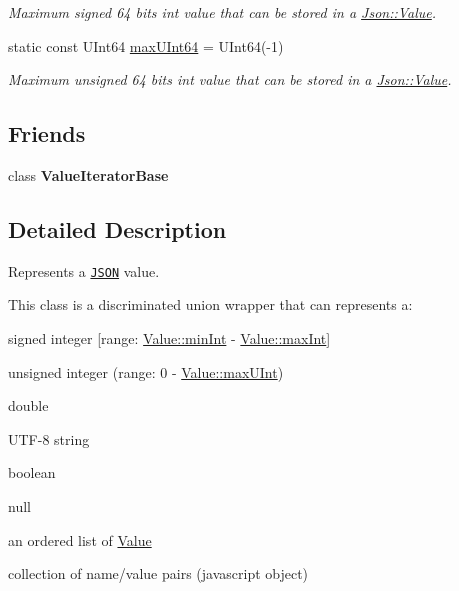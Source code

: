 \begin{DoxyCompactItemize}
\begin{DoxyCompactList}\small\item\em Maximum signed 64 bits int value that can be stored in a \hyperlink{class_json_1_1_value}{Json\+::\+Value}. \end{DoxyCompactList}\item 
\hypertarget{class_json_1_1_value_ae1eb89c305c39516696ff305cffa01da}{}static const U\+Int64 \hyperlink{class_json_1_1_value_ae1eb89c305c39516696ff305cffa01da}{max\+U\+Int64} = U\+Int64(-\/1)\label{class_json_1_1_value_ae1eb89c305c39516696ff305cffa01da}

\begin{DoxyCompactList}\small\item\em Maximum unsigned 64 bits int value that can be stored in a \hyperlink{class_json_1_1_value}{Json\+::\+Value}. \end{DoxyCompactList}\end{DoxyCompactItemize}
\subsection*{Friends}
\begin{DoxyCompactItemize}
\item 
\hypertarget{class_json_1_1_value_ad016df56489e5d360735457afba2f649}{}class {\bfseries Value\+Iterator\+Base}\label{class_json_1_1_value_ad016df56489e5d360735457afba2f649}

\end{DoxyCompactItemize}


\subsection{Detailed Description}
Represents a \href{http://www.json.org}{\tt J\+S\+O\+N} value. 

This class is a discriminated union wrapper that can represents a\+:
\begin{DoxyItemize}
\item signed integer \mbox{[}range\+: \hyperlink{class_json_1_1_value_a7df8a39e2502b8c92a6a41e3d752d2c8}{Value\+::min\+Int} -\/ \hyperlink{class_json_1_1_value_a978c799a8af3114ef7dab6fd0a310a1b}{Value\+::max\+Int}\mbox{]}
\item unsigned integer (range\+: 0 -\/ \hyperlink{class_json_1_1_value_ac79e63ee68d3aa914bfd6988be669b87}{Value\+::max\+U\+Int})
\item double
\item U\+T\+F-\/8 string
\item boolean
\item \textquotesingle{}null\textquotesingle{}
\item an ordered list of \hyperlink{class_json_1_1_value}{Value}
\item collection of name/value pairs (javascript object)
\end{DoxyItemize}


